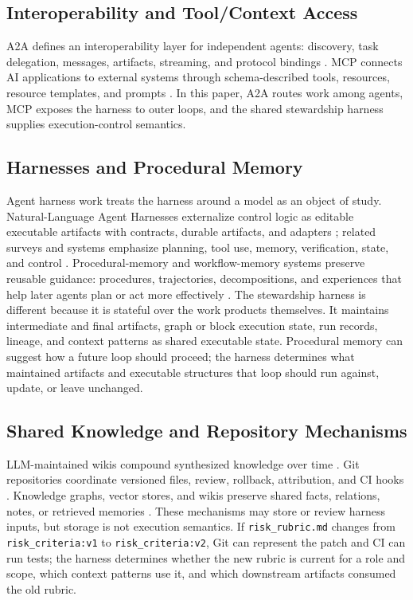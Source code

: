 \documentclass{article}
\begin{document}
\subsection{Interoperability and Tool/Context Access}

A2A defines an interoperability layer for independent agents: discovery, task delegation, messages, artifacts, streaming, and protocol bindings \cite{a2a2026spec}. MCP connects AI applications to external systems through schema-described tools, resources, resource templates, and prompts \cite{mcp2025intro,mcp2025tools,mcp2025resources,mcp2025prompts}. In this paper, A2A routes work among agents, MCP exposes the harness to outer loops, and the shared stewardship harness supplies execution-control semantics.

\subsection{Harnesses and Procedural Memory}

Agent harness work treats the harness around a model as an object of study. Natural-Language Agent Harnesses externalize control logic as editable executable artifacts with contracts, durable artifacts, and adapters \cite{pan2026nlah}; related surveys and systems emphasize planning, tool use, memory, verification, state, and control \cite{ning2026codeharness,lou2026autoharness,zhang2025harness}. Procedural-memory and workflow-memory systems preserve reusable guidance: procedures, trajectories, decompositions, and experiences that help later agents plan or act more effectively \cite{wang2024awm,fang2025memp,fan2024workflowllm,han2025legomem,yan2025memoryr1,borro2026memori}. The stewardship harness is different because it is stateful over the work products themselves. It maintains intermediate and final artifacts, graph or block execution state, run records, lineage, and context patterns as shared executable state. Procedural memory can suggest how a future loop should proceed; the harness determines what maintained artifacts and executable structures that loop should run against, update, or leave unchanged.

\subsection{Shared Knowledge and Repository Mechanisms}

LLM-maintained wikis compound synthesized knowledge over time \cite{karpathy2026llmwiki,wen2026knowledgecompounding}. Git repositories coordinate versioned files, review, rollback, attribution, and CI hooks \cite{chacon2014progit}. Knowledge graphs, vector stores, and wikis preserve shared facts, relations, notes, or retrieved memories \cite{hogan2021knowledgegraphs}. These mechanisms may store or review harness inputs, but storage is not execution semantics. If \texttt{risk\_rubric.md} changes from \texttt{risk\_criteria:v1} to \texttt{risk\_criteria:v2}, Git can represent the patch and CI can run tests; the harness determines whether the new rubric is current for a role and scope, which context patterns use it, and which downstream artifacts consumed the old rubric.
\end{document}
